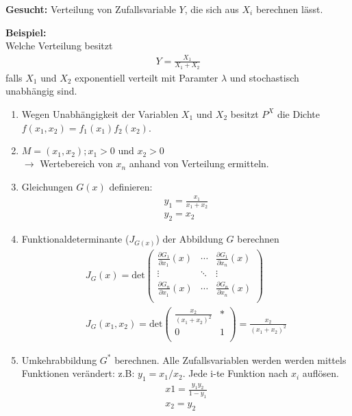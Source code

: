 \documentclass{article}
\begin{document}
\textbf{Gesucht:} Verteilung von Zufallsvariable $Y$, die sich aus $X_i$ berechnen lässt.

\textbf{Beispiel:}\\
Welche Verteilung besitzt
\begin{align}
	Y = \frac{X_1}{X_1 + X_2}
\end{align}
falls $X_1$ und $X_2$ exponentiell verteilt mit Paramter $\lambda$ und stochastisch
unabhängig sind.

\begin{enumerate}
	\item Wegen Unabhängigkeit der Variablen $X_1$ und $X_2$ besitzt $P^X$
		die Dichte $f(x_1,x_2) = f_1(x_1)f_2(x_2)$.
	\item $M = {(x_1, x_2); x_1 > 0 \text{ und } x_2 > 0}$\\
		$\longrightarrow$ Wertebereich von $x_n$ anhand von Verteilung ermitteln.
	\item Gleichungen  $G(x)$ definieren:
		\begin{align}
			y_1 = \frac{x_1}{x_1 + x_2}\\
			y_2 = x_2
		\end{align}
	\item Funktionaldeterminante ($J_{G(x)}$) der Abbildung $G$ berechnen
		\begin{align}
			J_{G}(x) =
			\text{det} \begin{pmatrix}
				\frac{\partial G_1}{\partial x_1} (x) & \cdots & \frac{\partial G_1}{\partial x_n} (x) \\
				\vdots  & \ddots & \vdots  \\
				\frac{\partial G_n}{\partial x_1} (x) & \cdots & \frac{\partial G_n}{\partial x_n} (x) \\
			\end{pmatrix}\\
			J_{G}(x_1,x_2) =
			\text{det} \begin{pmatrix}
				\frac{x_2}{(x_1 + x_2)^2} & * \\
				0 & 1 \\
			\end{pmatrix} = \frac{x_2}{(x_1 + x_2)^2}
		\end{align}
	\item Umkehrabbildung $G^*$ berechnen. Alle Zufallsvariablen werden
		werden mittels Funktionen verändert: z.B: $y_1 = x_1/x_2$.
		Jede i-te Funktion nach $x_i$ auflösen.
		\begin{align}
			x1 = \frac{y_1y_2}{1 - y_1}\\
			x_2 = y_2

\end{align}
\end{enumerate}
\end{document}
